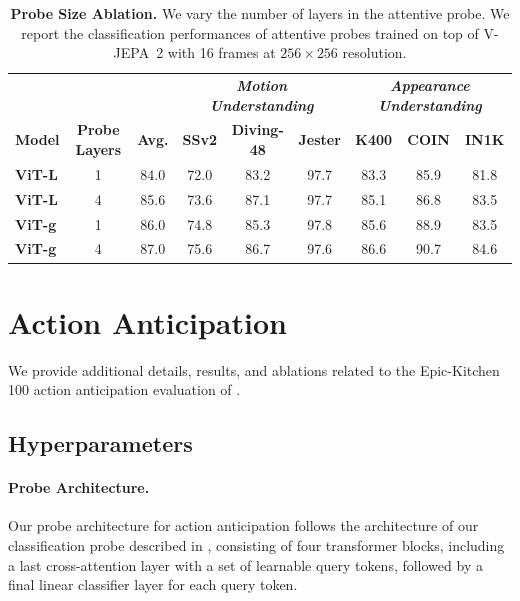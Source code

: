 \documentclass[]{fairmeta}
\newcommand{\model}{V-JEPA~2\xspace}
\begin{document}
\begin{table}[t]
    \small
    \caption{\small{\bf Probe Size Ablation.} \small We vary the number of layers in the attentive probe. We report the classification performances of attentive probes trained on top of \model with 16 frames at $256\times256$ resolution.}
    \centering
    \label{tb:probe_size}
    \begin{tabular}{l c c c c c c c c}
        \\
        \toprule
        & & & \multicolumn{3}{c}{\bf\it Motion Understanding} &  \multicolumn{3}{c}{\bf\it Appearance Understanding}\\
        \bf Model & \bf Probe Layers & \bf Avg. & \bf SSv2  & \bf Diving-48  & \bf Jester &  \bf K400 & \bf COIN & \bf IN1K\\
        \toprule
        \bf ViT-L & 1 & 84.0 & 72.0 & 83.2 & 97.7 & 83.3 & 85.9 & 81.8\\
        \bf ViT-L & 4 & 85.6 & 73.6 & 87.1 & 97.7 & 85.1 & 86.8 & 83.5\\
        \bf ViT-g & 1 & 86.0 & 74.8 & 85.3 & 97.8 & 85.6 & 88.9 & 83.5\\
        \bf ViT-g & 4 & 87.0 & 75.6 & 86.7 & 97.6 & 86.6 & 90.7 & 84.6\\
        \bottomrule
    \end{tabular}
\end{table}

\section{Action Anticipation} \label{app:action_anticipation}

We provide additional details, results, and ablations related to the Epic-Kitchen 100 action anticipation evaluation of .

\subsection{Hyperparameters} \label{app:action_anticipation_hp}

\paragraph{\bf Probe Architecture.} Our probe architecture for action anticipation follows the architecture of our classification probe described in , consisting of four transformer blocks, including a last cross-attention layer with a set of learnable query tokens, followed by a final linear classifier layer for each query token.
\end{document}
